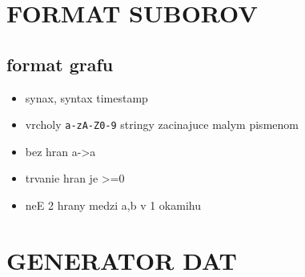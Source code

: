 \documentclass[11pt, a4paper]{article}
\theoremstyle{plain}
\theoremstyle{definition}
\theoremstyle{remark}
\begin{document}
\section{FORMAT SUBOROV}

\subsection{format grafu}
\begin{itemize}
    \item synax, syntax timestamp
    \item vrcholy \texttt{a-zA-Z0-9} stringy zacinajuce malym pismenom
    \item bez hran a->a
    \item trvanie hran je >=0
    \item neE 2 hrany medzi a,b v 1 okamihu
\end{itemize}

\section{GENERATOR DAT}
\end{document}
